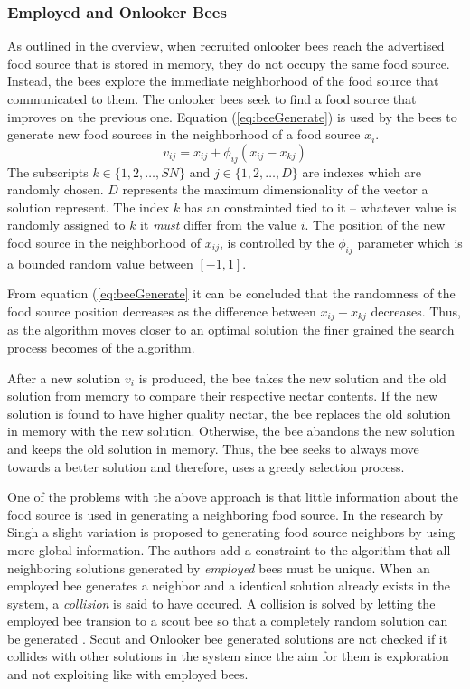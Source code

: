 \subsubsection{Employed and Onlooker Bees}
As outlined in the overview, when recruited onlooker bees reach the advertised food source that is stored in memory, they do not occupy the same food source. Instead, the bees explore the immediate neighborhood of the food source that communicated to them. The onlooker bees seek to find a food source that improves on the previous one. Equation (\ref{eq:beeGenerate}) is used by the bees to generate new food sources in the neighborhood of a food source $x_i$.
\begin{equation}
\label{eq:beeGenerate}
v_{ij} = x_{ij} + \phi_{ij}(x_{ij} - x_{kj})
\end{equation}
The subscripts $k \in \{1,2,\dots,SN\}$ and $j \in \{1,2,\dots,D\}$ are indexes which are randomly chosen. $D$ represents the maximum dimensionality of the vector a solution represent. The index $k$ has an constrainted tied to it -- whatever value is randomly assigned to $k$ it \emph{must} differ from the value $i$. The position of the new food source in the neighborhood of $x_{ij}$, is controlled by the $\phi_{ij}$ parameter which is a bounded random value between $[-1,1]$. 

From equation (\ref{eq:beeGenerate} it can be concluded that the randomness of the food source position decreases as the difference between $x_{ij} - x_{kj}$ decreases. Thus, as the algorithm moves closer to an optimal solution the finer grained the search process becomes of the algorithm.

After a new solution $v_i$ is produced, the bee takes the new solution and the old solution from memory to compare their respective nectar contents. If the new solution is found to have higher quality nectar, the bee replaces the old solution in memory with the new solution. Otherwise, the bee abandons the new solution and keeps the old solution in memory. Thus, the bee seeks to always move towards a better solution and therefore, uses a greedy selection process.

One of the problems with the above approach is that little information about the food source is used in generating a neighboring food source. In the research by Singh \cite{ABCLeafConstrained} a slight variation is proposed to generating food source neighbors by using more global information. The authors add a constraint to the algorithm that all neighboring solutions generated by \emph{employed} bees must be unique. When an employed bee generates a neighbor and a identical solution already exists in the system, a \emph{collision} is said to have occured. A collision is solved by letting the employed bee transion to a scout bee so that a completely random solution can be generated \cite{ABCLeafConstrained}. Scout and Onlooker bee generated solutions are not checked if it collides with other solutions in the system since the aim for them is exploration and not exploiting like with employed bees. 
